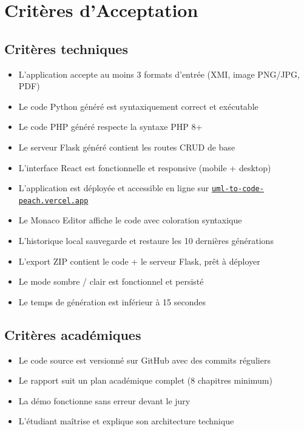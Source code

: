 \documentclass[12pt,a4paper]{article}
\begin{document}
\section{Critères d'Acceptation}

\subsection{Critères techniques}

\begin{itemize}[leftmargin=1.5em]
  \item L'application accepte au moins 3 formats d'entrée (XMI, image PNG/JPG, PDF)
  \item Le code Python généré est syntaxiquement correct et exécutable
  \item Le code PHP généré respecte la syntaxe PHP 8+
  \item Le serveur Flask généré contient les routes CRUD de base
  \item L'interface React est fonctionnelle et responsive (mobile + desktop)
  \item L'application est déployée et accessible en ligne sur \href{https://uml-to-code-peach.vercel.app}{\texttt{uml-to-code-peach.vercel.app}}
  \item Le Monaco Editor affiche le code avec coloration syntaxique
  \item L'historique local sauvegarde et restaure les 10 dernières générations
  \item L'export ZIP contient le code + le serveur Flask, prêt à déployer
  \item Le mode sombre / clair est fonctionnel et persisté
  \item Le temps de génération est inférieur à 15 secondes
\end{itemize}

\subsection{Critères académiques}

\begin{itemize}[leftmargin=1.5em]
  \item Le code source est versionné sur GitHub avec des commits réguliers
  \item Le rapport suit un plan académique complet (8 chapitres minimum)
  \item La démo fonctionne sans erreur devant le jury
  \item L'étudiant maîtrise et explique son architecture technique
\end{itemize}
\end{document}
